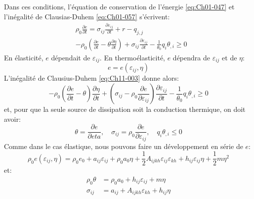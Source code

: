 Dans ces conditions, l'équation de conservation de l'énergie \eqref{eq:Ch01-047} et l'inégalité de Clausias-Duhem \eqref{eq:Ch01-057} s'écrivent: 
\begin{subequations}
\begin{align}
    &\rho_0 \frac{\partial e}{\partial t} = \sigma_{ij} \frac{\partial \varepsilon_{ij}}{\partial t} + r - q_{j,j}
    \label{eq:Ch11-002}\\
    &-\rho_0 \left(\frac{\partial e}{\partial t} - \theta\frac{\partial \eta}{\partial t}\right) + \sigma_{ij} \frac{\partial \varepsilon_{ij}}{\partial t} - \frac{1}{\theta_0} q_i \theta_{,i} \geq 0
    \label{eq:Ch11-003}
\end{align}
\end{subequations}
En élasticité, $e$ dépendait de $\varepsilon_{ij}$.
En thermoélasticité, $e$ dépendra de $\varepsilon_{ij}$ et de $\eta$: 
\begin{equation}
    e=e(\varepsilon_{ij},\eta)
    \label{eq:Ch11-004}
\end{equation}
L'inégalité de Clausius-Duhem \eqref{eq:Ch11-003} donne alors: 
\begin{equation}
    -\rho_0 \left(\frac{\partial e}{\partial t} - \theta \right) \frac{\partial \eta}{\partial t} + \left(\sigma_{ij} -\rho_0\frac{\partial e}{\partial \varepsilon_{ij}}\right)\frac{\partial \varepsilon_{ij}}{\partial t} - \frac{1}{\theta_0} q_i \theta_{,i} \geq 0
    \label{eq:Ch11-005}
\end{equation}
et, pour que la seule source de dissipation soit la conduction thermique, on doit avoir: 
\begin{equation}
    \theta=\frac{\partial e}{\partial eta},\quad \sigma_{ij} =\rho_0\frac{\partial e}{\partial \varepsilon_{ij}},\quad q_i \theta_{,i}\leq 0
    \label{eq:Ch11-006}
\end{equation}
Comme dans le cas élastique, nous pouvons faire un développement en série de $e$: 
\begin{equation}
    \rho_0 e(\varepsilon_{ij},\eta) = \rho_0 e_0  + a_{ij} \varepsilon_{ij} +\rho_0 a_0 \eta 
                                                  + \frac{1}{2} A_{ijkh} \varepsilon_{ij}\varepsilon_{kh} + h_{ij} \varepsilon_{ij} \eta + \frac{1}{2} m \eta^2
    \label{eq:Ch11-008}
\end{equation}
et:
\begin{equation}
  \begin{aligned}
    \rho_0 \theta & = \rho_0 a_0 + h_{ij} \varepsilon_{ij} + m \eta \\
    \sigma_{ij}   & = a_{ij} + A_{ijkh} \varepsilon_{kh} + h_{ij} \eta
  \end{aligned}
    \label{eq:Ch11-009}
\end{equation}
